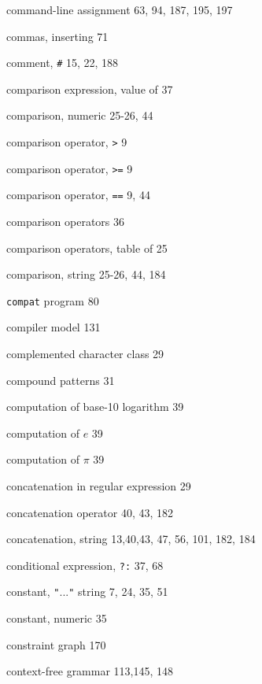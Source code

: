 \begin{multicols}{3}
\hangindent=3pc  command-line assignment 63, 94, 187, 195, 197

\hangindent=3pc  commas, inserting 71

\hangindent=3pc  comment, \verb'#' 15, 22, 188

\hangindent=3pc  comparison expression, value of 37

\hangindent=3pc  comparison, numeric 25-26, 44

\hangindent=3pc  comparison operator, \verb'>' 9

\hangindent=3pc  comparison operator, \verb'>=' 9

\hangindent=3pc  comparison operator, \verb'==' 9, 44

\hangindent=3pc  comparison operators 36

\hangindent=3pc  comparison operators, table of 25

\hangindent=3pc  comparison, string 25-26, 44, 184

\hangindent=3pc  \verb'compat' program 80

\hangindent=3pc  compiler model 131

\hangindent=3pc  complemented character class 29

\hangindent=3pc  compound patterns 31

\hangindent=3pc  computation of base-10 logarithm 39

\hangindent=3pc  computation of $e$ 39

\hangindent=3pc  computation of $\pi$ 39

\hangindent=3pc  concatenation in regular expression 29

\hangindent=3pc  concatenation operator 40, 43, 182

\hangindent=3pc  concatenation, string 13,40,43, 47, 56, 101, 182, 184

\hangindent=3pc  conditional expression, \verb'?:' 37, 68

\hangindent=3pc  constant, \verb'"'...\verb'"' string 7, 24, 35, 51

\hangindent=3pc  constant, numeric 35

\hangindent=3pc  constraint graph 170

\hangindent=3pc  context-free grammar 113,145, 148


\end{multicols}
